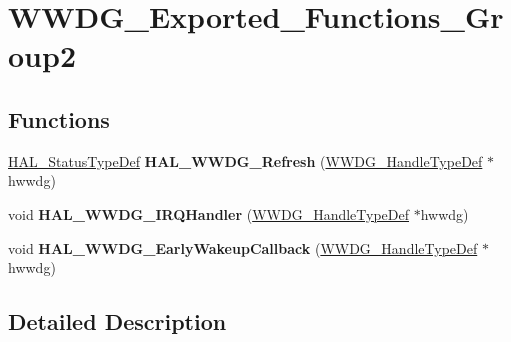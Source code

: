 \hypertarget{group___w_w_d_g___exported___functions___group2}{}\section{W\+W\+D\+G\+\_\+\+Exported\+\_\+\+Functions\+\_\+\+Group2}
\label{group___w_w_d_g___exported___functions___group2}
\subsection*{Functions}
\begin{DoxyCompactItemize}
\item 
\mbox{\label{group___w_w_d_g___exported___functions___group2_gaf88d543a2fe8520439b69c9f55e70d48}} 
\hyperlink{stm32f0xx__hal__def_8h_a63c0679d1cb8b8c684fbb0632743478f}{H\+A\+L\+\_\+\+Status\+Type\+Def} {\bfseries H\+A\+L\+\_\+\+W\+W\+D\+G\+\_\+\+Refresh} (\hyperlink{struct_w_w_d_g___handle_type_def}{W\+W\+D\+G\+\_\+\+Handle\+Type\+Def} $\ast$hwwdg)
\item 
\mbox{\label{group___w_w_d_g___exported___functions___group2_ga6521c5a0ff3184f951561302fb540fde}} 
void {\bfseries H\+A\+L\+\_\+\+W\+W\+D\+G\+\_\+\+I\+R\+Q\+Handler} (\hyperlink{struct_w_w_d_g___handle_type_def}{W\+W\+D\+G\+\_\+\+Handle\+Type\+Def} $\ast$hwwdg)
\item 
\mbox{\label{group___w_w_d_g___exported___functions___group2_gac939b6f7bd78682d222dacb8909b8788}} 
void {\bfseries H\+A\+L\+\_\+\+W\+W\+D\+G\+\_\+\+Early\+Wakeup\+Callback} (\hyperlink{struct_w_w_d_g___handle_type_def}{W\+W\+D\+G\+\_\+\+Handle\+Type\+Def} $\ast$hwwdg)
\end{DoxyCompactItemize}


\subsection{Detailed Description}
